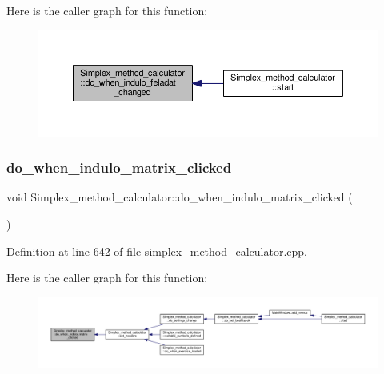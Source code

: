 Here is the caller graph for this function\+:\nopagebreak
\begin{figure}[H]
\begin{center}
\leavevmode
\includegraphics[width=350pt]{classSimplex__method__calculator_a706085a8cbc9e0a452da0cd2807c5ea4_icgraph}
\end{center}
\end{figure}
\mbox{\label{classSimplex__method__calculator_ae675adcf3b8b5104430cb65f2e13f729}} 
\subsubsection{\texorpdfstring{do\+\_\+when\+\_\+indulo\+\_\+matrix\+\_\+clicked}{do\_when\_indulo\_matrix\_clicked}}
{\footnotesize\ttfamily void Simplex\+\_\+method\+\_\+calculator\+::do\+\_\+when\+\_\+indulo\+\_\+matrix\+\_\+clicked (\begin{DoxyParamCaption}{ }\end{DoxyParamCaption})\hspace{0.3cm}{\ttfamily [slot]}}



Definition at line 642 of file simplex\+\_\+method\+\_\+calculator.\+cpp.

Here is the caller graph for this function\+:\nopagebreak
\begin{figure}[H]
\begin{center}
\leavevmode
\includegraphics[width=350pt]{classSimplex__method__calculator_ae675adcf3b8b5104430cb65f2e13f729_icgraph}
\end{center}
\end{figure}
\mbox{\label{classSimplex__method__calculator_a249c2881a8b5853cdc8b53d74dbae50d}} 
